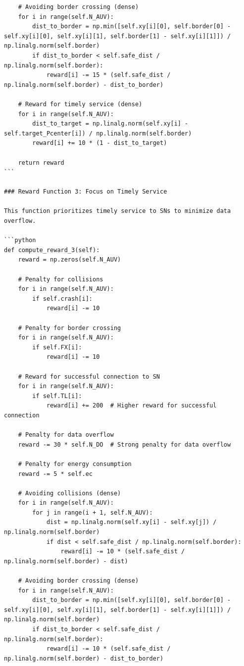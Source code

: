 \documentclass{article}
\begin{document}
\begin{verbatim}
    # Avoiding border crossing (dense)
    for i in range(self.N_AUV):
        dist_to_border = np.min([self.xy[i][0], self.border[0] - self.xy[i][0], self.xy[i][1], self.border[1] - self.xy[i][1]]) / np.linalg.norm(self.border)
        if dist_to_border < self.safe_dist / np.linalg.norm(self.border):
            reward[i] -= 15 * (self.safe_dist / np.linalg.norm(self.border) - dist_to_border)

    # Reward for timely service (dense)
    for i in range(self.N_AUV):
        dist_to_target = np.linalg.norm(self.xy[i] - self.target_Pcenter[i]) / np.linalg.norm(self.border)
        reward[i] += 10 * (1 - dist_to_target)

    return reward
```

### Reward Function 3: Focus on Timely Service

This function prioritizes timely service to SNs to minimize data overflow.

```python
def compute_reward_3(self):
    reward = np.zeros(self.N_AUV)
    
    # Penalty for collisions
    for i in range(self.N_AUV):
        if self.crash[i]:
            reward[i] -= 10

    # Penalty for border crossing
    for i in range(self.N_AUV):
        if self.FX[i]:
            reward[i] -= 10

    # Reward for successful connection to SN
    for i in range(self.N_AUV):
        if self.TL[i]:
            reward[i] += 200  # Higher reward for successful connection

    # Penalty for data overflow
    reward -= 30 * self.N_DO  # Strong penalty for data overflow

    # Penalty for energy consumption
    reward -= 5 * self.ec

    # Avoiding collisions (dense)
    for i in range(self.N_AUV):
        for j in range(i + 1, self.N_AUV):
            dist = np.linalg.norm(self.xy[i] - self.xy[j]) / np.linalg.norm(self.border)
            if dist < self.safe_dist / np.linalg.norm(self.border):
                reward[i] -= 10 * (self.safe_dist / np.linalg.norm(self.border) - dist)

    # Avoiding border crossing (dense)
    for i in range(self.N_AUV):
        dist_to_border = np.min([self.xy[i][0], self.border[0] - self.xy[i][0], self.xy[i][1], self.border[1] - self.xy[i][1]]) / np.linalg.norm(self.border)
        if dist_to_border < self.safe_dist / np.linalg.norm(self.border):
            reward[i] -= 10 * (self.safe_dist / np.linalg.norm(self.border) - dist_to_border)


\end{verbatim}
\end{document}
